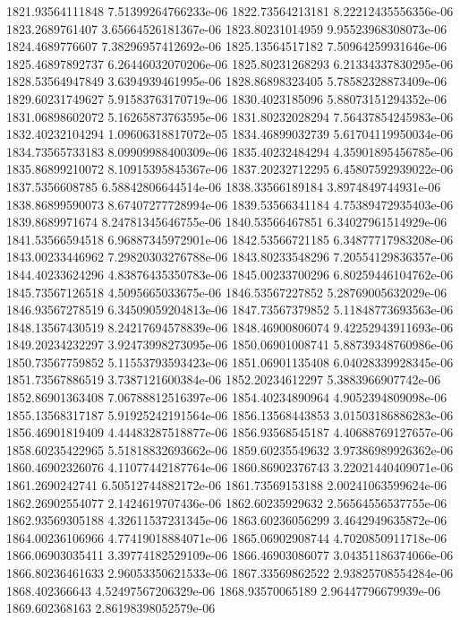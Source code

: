 {1821.93564111848 7.51399264766233e-06
1822.73564213181 8.22212435556356e-06
1823.2689761407 3.65664526181367e-06
1823.80231014959 9.95523968308073e-06
1824.4689776607 7.38296957412692e-06
1825.13564517182 7.50964259931646e-06
1825.46897892737 6.26446032070206e-06
1825.80231268293 6.21334337830295e-06
1828.53564947849 3.6394939461995e-06
1828.86898323405 5.78582328873409e-06
1829.60231749627 5.91583763170719e-06
1830.4023185096 5.88073151294352e-06
1831.06898602072 5.16265873763595e-06
1831.80232028294 7.56437854245983e-06
1832.40232104294 1.09606318817072e-05
1834.46899032739 5.61704119950034e-06
1834.73565733183 8.09909988400309e-06
1835.40232484294 4.35901895456785e-06
1835.86899210072 8.10915395845367e-06
1837.20232712295 6.45807592939022e-06
1837.5356608785 6.58842806644514e-06
1838.33566189184 3.8974849744931e-06
1838.86899590073 8.67407277728994e-06
1839.53566341184 4.75389472935403e-06
1839.8689971674 8.24781345646755e-06
1840.53566467851 6.34027961514929e-06
1841.53566594518 6.96887345972901e-06
1842.53566721185 6.34877717983208e-06
1843.00233446962 7.29820303276788e-06
1843.80233548296 7.20554129836357e-06
1844.40233624296 4.83876435350783e-06
1845.00233700296 6.80259446104762e-06
1845.73567126518 4.5095665033675e-06
1846.53567227852 5.28769005632029e-06
1846.93567278519 6.34509059204813e-06
1847.73567379852 5.11848773693563e-06
1848.13567430519 8.24217694578839e-06
1848.46900806074 9.42252943911693e-06
1849.20234232297 3.92473998273095e-06
1850.06901008741 5.88739348760986e-06
1850.73567759852 5.11553793593423e-06
1851.06901135408 6.04028339928345e-06
1851.73567886519 3.7387121600384e-06
1852.20234612297 5.3883966907742e-06
1852.86901363408 7.06788812516397e-06
1854.40234890964 4.9052394809098e-06
1855.13568317187 5.91925242191564e-06
1856.13568443853 3.01503186886283e-06
1856.46901819409 4.44483287518877e-06
1856.93568545187 4.40688769127657e-06
1858.60235422965 5.51818832693662e-06
1859.60235549632 3.97386989926362e-06
1860.46902326076 4.11077442187764e-06
1860.86902376743 3.22021440409071e-06
1861.2690242741 6.50512744882172e-06
1861.73569153188 2.00241063599624e-06
1862.26902554077 2.1424619707436e-06
1862.60235929632 2.56564556537755e-06
1862.93569305188 4.32611537231345e-06
1863.60236056299 3.4642949635872e-06
1864.00236106966 4.77419018884071e-06
1865.06902908744 4.7020850911718e-06
1866.06903035411 3.39774182529109e-06
1866.46903086077 3.04351186374066e-06
1866.80236461633 2.96053350621533e-06
1867.33569862522 2.93825708554284e-06
1868.402366643 4.52497567206329e-06
1868.93570065189 2.96447796679939e-06
1869.602368163 2.86198398052579e-06
}
